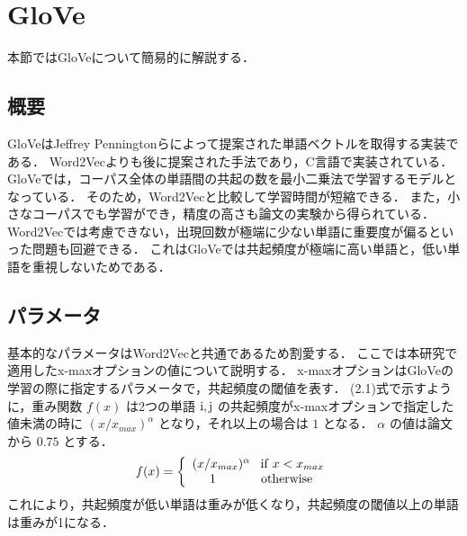 \section{GloVe}
本節ではGloVeについて簡易的に解説する．

\subsection{概要}
GloVeはJeffrey Penningtonら\cite{glove}によって提案された単語ベクトルを取得する実装である．
Word2Vecよりも後に提案された手法であり，C言語で実装されている．
GloVeでは，コーパス全体の単語間の共起の数を最小二乗法で学習するモデルとなっている．
そのため，Word2Vecと比較して学習時間が短縮できる．
また，小さなコーパスでも学習ができ，精度の高さも論文の実験から得られている．
Word2Vecでは考慮できない，出現回数が極端に少ない単語に重要度が偏るといった問題も回避できる．
これはGloVeでは共起頻度が極端に高い単語と，低い単語を重視しないためである．

\subsection{パラメータ}
基本的なパラメータはWord2Vecと共通であるため割愛する．
ここでは本研究で適用したx-maxオプションの値について説明する．
x-maxオプションはGloVeの学習の際に指定するパラメータで，共起頻度の閾値を表す．
(2.1)式で示すように，重み関数 $ f(x) $ は2つの単語 $ {\rm i, j} $ の共起頻度がx-maxオプションで指定した値未満の時に 
$ (x/x_{max})^\alpha $ となり，それ以上の場合は $ 1 $ となる．
$ \alpha $ の値は論文から $ 0.75 $ とする．
\begin{equation}
f(x) = \left\{\begin{array}{l}
(x/x_{max})^\alpha \;\;\; {\rm if} \; x < x_{max} \\
\;\;\;\;\; 1 \;\;\;\;\;\;\;\;\;\;\;\;\; {\rm otherwise}
\end{array} \right.
\end{equation}
これにより，共起頻度が低い単語は重みが低くなり，共起頻度の閾値以上の単語は重みが1になる．

